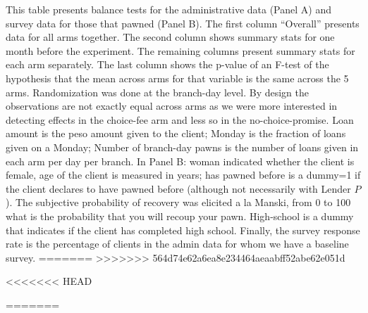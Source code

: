 \documentclass[oneside,11pt]{article}
\begin{document}
{\begin{table}[H]
\end{table}
\vspace{-.3in}
\scriptsize {
\noindent This table presents balance tests for the administrative data (Panel A) and survey data for those that pawned (Panel B). The first column ``Overall'' presents data for all arms together. The second column shows summary stats for one month before the experiment. The remaining columns present summary stats  for each arm separately. The last column shows the p-value of an F-test of the hypothesis that the mean across arms for that variable is the same across the 5 arms. Randomization was done at the branch-day level. By design the observations are not exactly equal across arms as we were more interested in detecting effects in the choice-fee arm and less so in the no-choice-promise. Loan amount is the peso amount given to the client; Monday is the fraction of loans given on a Monday; Number of branch-day pawns is the number of loans given in each arm per day per branch.  In Panel B: woman indicated whether the client is female, age of the client is measured in years; has pawned before is a dummy=1 if the client declares to have pawned before (although not necessarily with Lender $P$). The subjective probability of recovery was elicited a la Manski, from 0 to 100 what is the probability that you will recoup your pawn. High-school is a dummy that indicates if the client has completed high school. Finally, the survey response rate is the percentage of clients in the admin data for whom we have a baseline survey. %
}
=======
>>>>>>> 564d74e62a6ea8e234464aeaabff52abe62e051d



\newpage
<<<<<<< HEAD

=======


\clearpage

%
%






\newpage
\singlespacing

}
\end{document}
